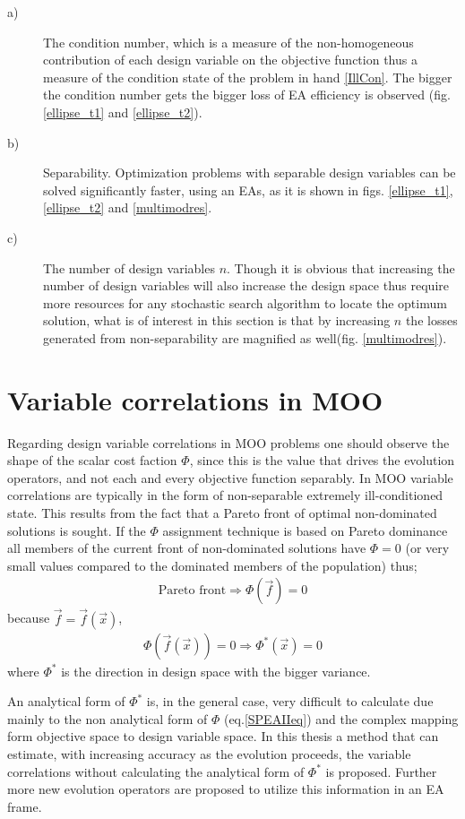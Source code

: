 \begin{description}
  \item[a)] The condition number, which is a measure of the non-homogeneous contribution of each design variable on the objective function thus a measure of the condition state of the problem in hand \ref{IllCon}. The bigger the condition number gets the bigger loss of EA efficiency is observed (fig. \ref{ellipse_t1} and \ref{ellipse_t2}).    
  \item[b)] Separability. Optimization problems with separable design variables can be solved significantly faster, using an EAs, as it is shown in figs. \ref{ellipse_t1}, \ref{ellipse_t2} and \ref{multimodres}.  
  \item[c)] The number of design variables $n$. Though it is obvious that increasing the number of design variables will also increase the design space thus require more resources for any stochastic search algorithm to locate the optimum solution, what is of interest in this section is that by increasing $n$ the losses generated from non-separability are magnified as well(fig. \ref{multimodres}).  
\end{description}
\section{Variable correlations in MOO}
\label{VCMM}
Regarding design variable correlations in MOO problems one should observe the shape of the scalar cost faction $\Phi$, since this is the value that drives the evolution operators, and not each and every objective function separably. In MOO variable correlations are typically in the form of non-separable extremely ill-conditioned state. This results from the fact that a Pareto front of optimal non-dominated solutions is sought. If the $\Phi$ assignment technique is based on Pareto dominance all members of the current front of non-dominated solutions have $\Phi=0$ (or very small values compared to the dominated members of the population) thus;
\begin{eqnarray}
   \mbox{Pareto front} \Rightarrow 	\Phi(\vec{f})=0  
   \label{Corr-Par} 
\end{eqnarray}
because $\vec{f}=\vec{f}(\vec{x})$,
\begin{eqnarray}
	\Phi(\vec{f}(\vec{x}))=0 \Rightarrow \Phi^*(\vec{x})=0
    \label{Corr-Par2}
\end{eqnarray}
where $\Phi^*$ is the direction in design space with the bigger variance.

An analytical form of $\Phi^*$ is, in the general case, very difficult to calculate due mainly to the non analytical form of $\Phi$ (eq.\ref{SPEAIIeq}) and the complex mapping form objective space to design variable space. In this thesis a method that can estimate, with increasing accuracy as the evolution proceeds, the variable correlations without calculating the analytical form of $\Phi^*$ is proposed. Further more new evolution operators are proposed to utilize this information in an EA frame.  

